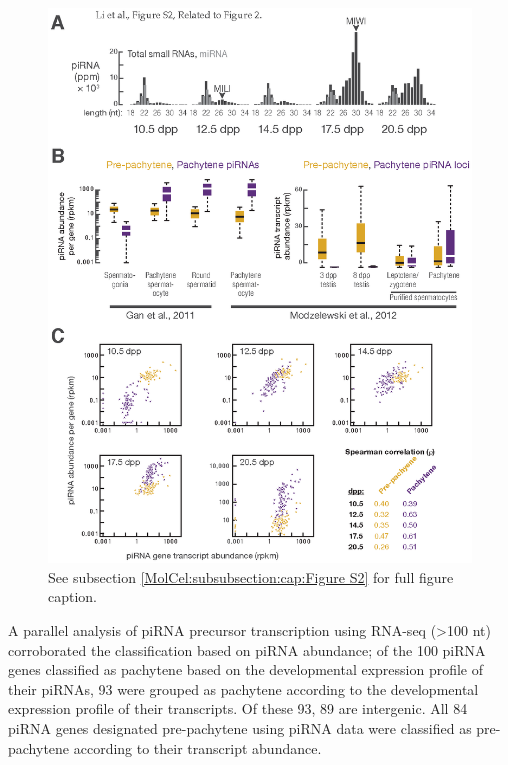     \begin{figure}\tiny %
      \centering 
      \includegraphics{Figures/MolCel/MolCel2013_FigS2.eps}
      \caption[Pre-pachytene piRNAs Persist in Pachytene Spermatocytes]
      {
        See subsection \ref{MolCel:subsubsection:cap:Figure S2} for full figure caption.
     	  }
      \label{MolCel:fig:MolCelS2}
      \end{figure}

    A parallel analysis of piRNA precursor transcription using RNA-seq (>100 nt) corroborated the classification based on piRNA abundance; of the 100 piRNA genes classified as pachytene based on the developmental expression profile of their piRNAs, 93 were grouped as pachytene according to the developmental expression profile of their transcripts. Of these 93, 89 are intergenic. All 84 piRNA genes designated pre-pachytene using piRNA data were classified as pre-pachytene according to their transcript abundance.

